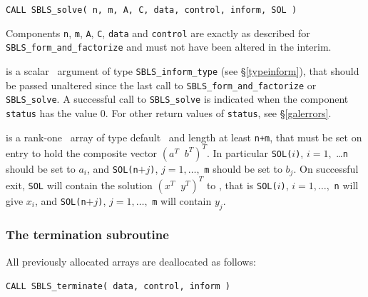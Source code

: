\documentclass{galahad}
\newcommand{\packagename}{SBLS}
\begin{document}
\hspace{8mm}
{\tt CALL \packagename\_solve( n, m, A, C, data, control, inform, SOL )}
\vspace*{1mm}

\noindent
Components {\tt n}, {\tt m},  {\tt A}, {\tt C}, {\tt data} and
{\tt control} are exactly as described for
{\tt \packagename\_form\_and\_factorize} and must not have been
altered in the interim.

\vspace*{-3mm}
\begin{description}

 is a scalar \intentout\ argument of type
{\tt \packagename\_inform\_type}
(see \S\ref{typeinform}), that should be passed unaltered since
the last call to {\tt \packagename\_form\_and\_factorize} or
{\tt \packagename\_solve}.  A successful call to
{\tt \packagename\_solve}
is indicated when the  component {\tt status} has the value 0.
For other return values of {\tt status}, see \S\ref{galerrors}.

 is a rank-one  \intentinout\ array of type default \real\
and length at least {\tt n+m}, that must be set on entry to hold
the composite vector $( a^T \;\; b^T)^T$.
In particular {\tt SOL(}$i${\tt )}, $i = 1,$ \ldots {\tt n} should be
set to $a_i$, and
{\tt SOL(n}$+j${\tt )}, $j = 1, \ldots,$ {\tt m} should be
set to $b_j$. On successful exit, {\tt SOL}
will contain the solution $( x^T \;\; y^T)^T$ to , that is
{\tt SOL(}$i${\tt )}, $i = 1, \ldots,$ {\tt n} will give
$x_i$, and {\tt SOL(n}$+j${\tt )}, $j = 1,\ldots,$ {\tt m} will contain
$y_j$.



\end{description}


\subsubsection{The  termination subroutine}
All previously allocated arrays are deallocated as follows:
\vspace*{1mm}

\hspace{8mm}
{\tt CALL \packagename\_terminate( data, control, inform )}
\end{document}
